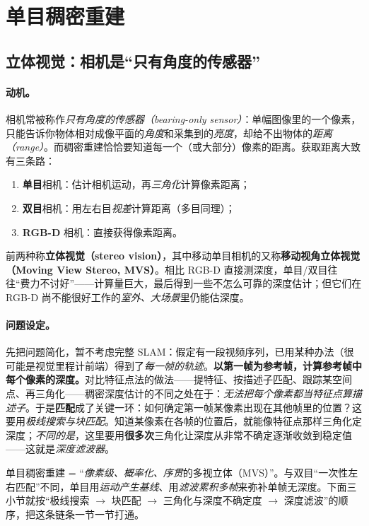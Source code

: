 \section{单目稠密重建}
\label{sec:dense-mono}

\subsection{立体视觉：相机是“只有角度的传感器”}
\label{sec:dense-stereo-entry}

\paragraph{动机。}
相机常被称作\emph{只有角度的传感器（bearing-only sensor）}：单幅图像里的一个像素，只能告诉你物体相对成像平面的\emph{角度}和采集到的\emph{亮度}，却给不出物体的\emph{距离（range）}\cite{gaoxiang2019slam14}。而稠密重建恰恰要知道每一个（或大部分）像素的距离。获取距离大致有三条路：
\begin{enumerate}
  \item \textbf{单目}相机：估计相机运动，再\emph{三角化}计算像素距离；
  \item \textbf{双目}相机：用左右目\emph{视差}计算距离（多目同理）；
  \item \textbf{RGB-D} 相机：直接获得像素距离。
\end{enumerate}
前两种称\textbf{立体视觉（stereo vision）}，其中移动单目相机的又称\textbf{移动视角立体视觉（Moving View Stereo, MVS）}。相比 RGB-D 直接测深度，单目/双目往往“费力不讨好”——计算量巨大，最后得到一些不怎么可靠的深度估计；但它们在 RGB-D 尚不能很好工作的\emph{室外、大场景}里仍能估深度\cite{gaoxiang2019slam14}。

\paragraph{问题设定。}
先把问题简化，暂不考虑完整 SLAM：假定有一段视频序列，已用某种办法（很可能是视觉里程计前端）得到了\emph{每一帧的轨迹}。\textbf{以第一帧为参考帧，计算参考帧中每个像素的深度。}对比特征点法的做法——提特征、按描述子匹配、跟踪某空间点、再三角化——稠密深度估计的不同之处在于：\emph{无法把每个像素都当特征点算描述子}。于是\textbf{匹配}成了关键一环：如何确定第一帧某像素出现在其他帧里的位置？这要用\emph{极线搜索与块匹配}。知道某像素在各帧的位置后，就能像特征点那样三角化定深度；\emph{不同的是}，这里要用\textbf{很多次}三角化让深度从非常不确定逐渐收敛到稳定值——这就是\emph{深度滤波器}\cite{gaoxiang2019slam14}。

\begin{insight}
单目稠密重建 = “\emph{像素级、概率化、序贯}的多视立体（MVS）”。与双目“一次性左右匹配”不同，单目用\emph{运动产生基线}、用\emph{滤波累积多帧}来弥补单帧无深度。下面三小节就按“极线搜索 $\to$ 块匹配 $\to$ 三角化与深度不确定度 $\to$ 深度滤波”的顺序，把这条链条一节一节打通。
\end{insight}

